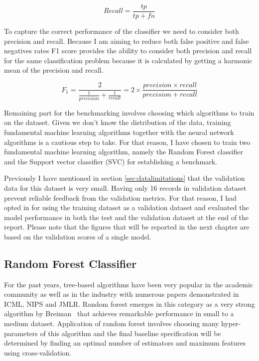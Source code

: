 \begin{equation}
    Recall = \frac{tp}{tp + fn}
\end{equation}

To capture the correct performance of the classifier we need to consider both precision and recall.
Because I am aiming to reduce both false positive and false negatives rates
F1 score provides the ability to consider both precision and recall for the same classification problem because it is calculated by getting a harmonic mean of the precision and recall.

\begin{equation}
    F_1 = \frac{2}{\frac{1}{precision} + \frac{1}{recall}} = 2 \times \frac{precision \times recall}{precision + recall}
\end{equation}


Remaining part for the benchmarking involves choosing which algorithms to train on the dataset.
Given we don't know the distribution of the data, training fundamental machine learning algorithms together with the neural network algorithms is a cautious step to take. 
For that reason, I have chosen to train two fundamental machine learning algorithm, namely the Random Forest classifier and the Support vector classifier (SVC) for establishing a benchmark.

Previously I have mentioned in section \ref{sec:datalimitations} that the validation data for this dataset is very small.
Having only 16 records in validation dataset prevent reliable feedback from the validation metrics. 
For that reason, I had opted in for using the training dataset as a validation dataset and evaluated the model performance in both the test and the validation dataset at the end of the report.
Please note that the figures that will be reported in the next chapter are based on the validation scores of a single model.


\subsection{Random Forest Classifier}
For the past years, tree-based algorithms have been very popular in the academic community as well as in the industry with numerous papers demonstrated in ICML, NIPS and JMLR.
Random forest emerges in this category as a very strong algorithm by Breiman~\cite{randomforest} that achieves remarkable performance in small to a medium dataset.
Application of random forest involves choosing many hyper-parameters of this algorithm and 
the final baseline specification will be determined by finding an optimal number of estimators and maximum features using cross-validation.



